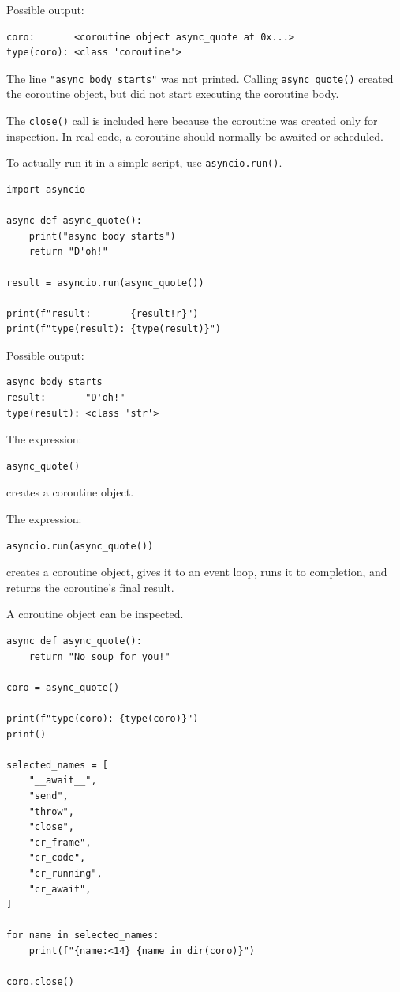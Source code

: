Possible output:

\begin{verbatim}
coro:       <coroutine object async_quote at 0x...>
type(coro): <class 'coroutine'>
\end{verbatim}

The line \texttt{"async body starts"} was not printed. Calling \texttt{async\_quote()} created the coroutine object, but did not start executing the coroutine body.

The \texttt{close()} call is included here because the coroutine was created only for inspection. In real code, a coroutine should normally be awaited or scheduled.

To actually run it in a simple script, use \texttt{asyncio.run()}.

\begin{verbatim}
import asyncio

async def async_quote():
    print("async body starts")
    return "D'oh!"

result = asyncio.run(async_quote())

print(f"result:       {result!r}")
print(f"type(result): {type(result)}")
\end{verbatim}

Possible output:

\begin{verbatim}
async body starts
result:       "D'oh!"
type(result): <class 'str'>
\end{verbatim}

The expression:

\begin{verbatim}
async_quote()
\end{verbatim}

creates a coroutine object.

The expression:

\begin{verbatim}
asyncio.run(async_quote())
\end{verbatim}

creates a coroutine object, gives it to an event loop, runs it to completion, and returns the coroutine's final result.

A coroutine object can be inspected.

\begin{verbatim}
async def async_quote():
    return "No soup for you!"

coro = async_quote()

print(f"type(coro): {type(coro)}")
print()

selected_names = [
    "__await__",
    "send",
    "throw",
    "close",
    "cr_frame",
    "cr_code",
    "cr_running",
    "cr_await",
]

for name in selected_names:
    print(f"{name:<14} {name in dir(coro)}")

coro.close()
\end{verbatim}

